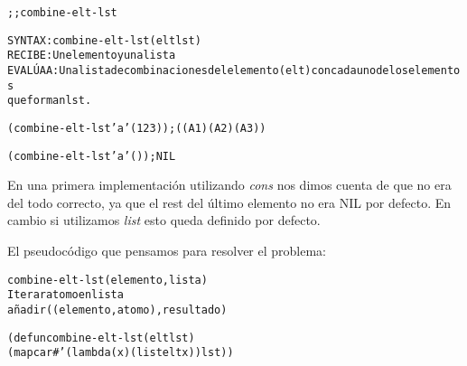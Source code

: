 
\begin{aibox}{\function}
\begin{alltt}
;; combine-elt-lst

SYNTAX: combine-elt-lst (elt lst)
RECIBE: Un elemento y una lista
EVALÚA A: Una lista de combinaciones del elemento (elt) con cada uno de los elementos
que forman lst.
\end{alltt}
\end{aibox}

\begin{aibox}{\examples}

\begin{alltt}
(combine-elt-lst 'a '(1 2 3)); ((A 1) (A 2) (A 3))

(combine-elt-lst 'a '()); NIL
\end{alltt}

\end{aibox}

\begin{aibox}{\comments}
En una primera implementación utilizando \emph{cons} nos dimos cuenta de que no era del todo correcto, ya que el rest del último elemento no era NIL por defecto. En cambio si utilizamos \emph{list} esto queda definido por defecto.
\end{aibox}
\begin{aibox}{\pseudocode}
El pseudocódigo que pensamos para resolver el problema:

\begin{alltt}
combine-elt-lst (elemento,lista)
    Iterar atomo en lista
        añadir ((elemento,atomo),resultado)
\end{alltt}
\end{aibox}
\begin{aibox}{\code}

\begin{alltt}

(defun combine-elt-lst (elt lst)
            (mapcar #'(lambda (x) (list elt x)) lst))

\end{alltt}
\end{aibox}
